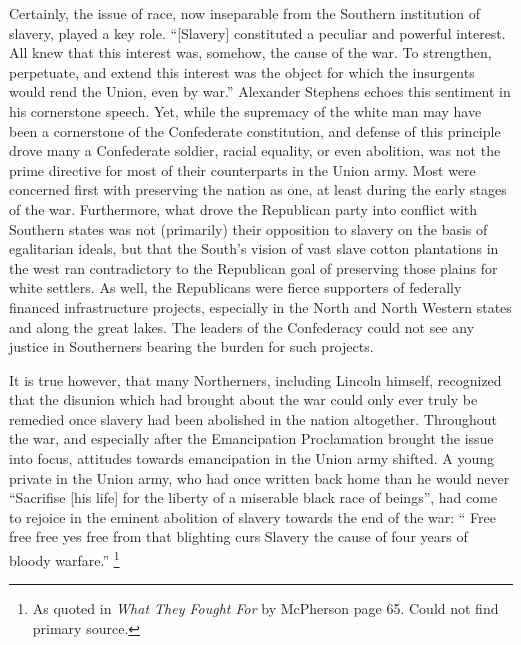 \documentclass[a4paper]{article}
\begin{document}
Certainly, the issue of race, now inseparable from the Southern institution of slavery, played a key role. “[Slavery] constituted a peculiar and powerful interest. All knew that this interest was, somehow, the cause of the war. To strengthen, perpetuate, and extend this interest was the object for which the insurgents would rend the Union, even by war.” \autocite[]{Lincoln}Alexander Stephens echoes this sentiment in his cornerstone speech. \autocite[]{Stephens} Yet, while the supremacy of the white man may have been a cornerstone of the Confederate constitution, and defense of this principle drove many a Confederate soldier, racial equality, or even abolition, was not the  prime directive for most of their counterparts in the Union army. \autocite[pp. 47-69]{WhatFoughtFor} Most were concerned first with preserving the nation as one, at least during the early stages of the war. Furthermore, what drove the Republican party into conflict with Southern states was not (primarily) their opposition to slavery on the basis of egalitarian ideals, but that the South’s vision of vast slave cotton plantations in the west ran contradictory to the Republican goal of preserving those plains for white settlers. As well, the Republicans were fierce supporters of federally financed infrastructure projects, especially in the North and North Western states and along the great lakes. The leaders of the Confederacy could not see any justice in Southerners bearing the burden for such projects.\autocite[]{Stephens}

It is true however, that many Northerners, including Lincoln himself, recognized that the disunion which had brought about the war could only ever truly be remedied once slavery had been abolished in the nation altogether.\autocite[]{HouseDivided, WhatFoughtFor} Throughout the war, and especially after the Emancipation Proclamation brought the issue into focus, attitudes towards emancipation in the Union army shifted. A young private in the Union army, who had once written back home than he would never “Sacrifise [his life] for the liberty of a miserable black race of beings”, had come to rejoice in the eminent abolition of slavery towards the end of the war: “ Free free free yes free from that blighting curs Slavery the cause of four years of bloody warfare.” \footnote{As quoted in \textit{What They Fought For} by McPherson page 65. Could not find primary source.}
\end{document}
